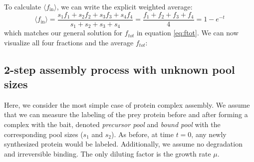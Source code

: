 \documentclass{article}
\newcommand{\fin}{\ensuremath{\langle f_{\text{in}} \rangle}}
\begin{document}
To calculate $\fin$, we can write the explicit weighted average:
\begin{equation}
    \fin = \frac{s_1 f_1 + s_2 f_2 + s_3 f_3 + s_4 f_4}{s_1 + s_2 + s_3 + s_4} = \frac{f_1 + f_2 + f_3 + f_4}{4} = 1 - e^{-t}
\end{equation}
which matches our general solution for $f_{tot}$ in equation \ref{eq:ftot}. We can now visualize all four fractions and the average $f_{tot}$:
\begin{center}
\end{center}

\subsection{2-step assembly process with unknown pool sizes}
Here, we consider the most simple case of protein complex assembly. We assume that we can measure the labeling of the prey protein before and after forming a complex with the bait, denoted \textit{precursor pool} and \textit{bound pool} with the corresponding pool sizes ($s_1$ and $s_2$). As before, at time $t = 0$, any newly synthesized protein would be labeled. Additionally, we assume no degradation and irreversible binding. The only diluting factor is the growth rate $\mu$.
\end{document}

